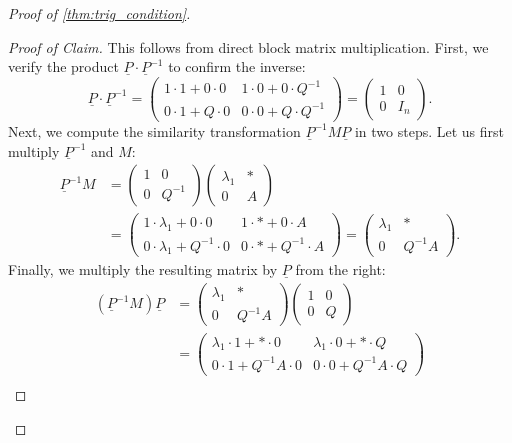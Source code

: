 \begin{proof}[Proof of \cref{thm:trig_condition}]
  \begin{proof}[Proof of Claim]
    This follows from direct block matrix multiplication. First, we verify the product $\underline{P} \cdot \underline{P}^{-1}$ to confirm the inverse:
    \[ \underline{P} \cdot \underline{P}^{-1} = \left(\begin{array}{c|c} 1 \cdot 1 + 0 \cdot 0 & 1 \cdot 0 + 0 \cdot Q^{-1} \\ \hline 0 \cdot 1 + Q \cdot 0 & 0 \cdot 0 + Q \cdot Q^{-1} \end{array}\right) = \left(\begin{array}{c|c} 1 & 0 \\ \hline 0 & I_n \end{array}\right). \]
    Next, we compute the similarity transformation $\underline{P}^{-1} M \underline{P}$ in two steps. Let us first multiply $\underline{P}^{-1}$ and $M$:
    \begin{align*}
      \underline{P}^{-1} M &= \left(\begin{array}{c|c} 1 & 0 \\ \hline 0 & Q^{-1} \end{array}\right) \left(\begin{array}{c|c} \lambda_1 & * \\ \hline 0 & A \end{array}\right) \\
      &= \left(\begin{array}{c|c} 1 \cdot \lambda_1 + 0 \cdot 0 & 1 \cdot * + 0 \cdot A \\ \hline 0 \cdot \lambda_1 + Q^{-1} \cdot 0 & 0 \cdot * + Q^{-1} \cdot A \end{array}\right) = \left(\begin{array}{c|c} \lambda_1 & * \\ \hline 0 & Q^{-1}A \end{array}\right).
    \end{align*}
    Finally, we multiply the resulting matrix by $\underline{P}$ from the right:
    \begin{align*}
      (\underline{P}^{-1} M) \underline{P} &= \left(\begin{array}{c|c} \lambda_1 & * \\ \hline 0 & Q^{-1}A \end{array}\right) \left(\begin{array}{c|c} 1 & 0 \\ \hline 0 & Q \end{array}\right) \\
      &= \left(\begin{array}{c|c} \lambda_1 \cdot 1 + * \cdot 0 & \lambda_1 \cdot 0 + * \cdot Q \\ \hline 0 \cdot 1 + Q^{-1}A \cdot 0 & 0 \cdot 0 + Q^{-1}A \cdot Q \end{array}\right) \\

\end{align*}
\end{proof}
\end{proof}
